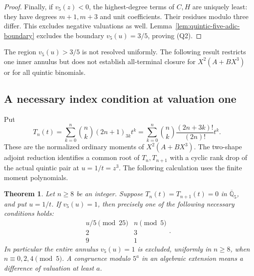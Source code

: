 \documentclass[11pt]{article}
\newtheorem{theorem}{Theorem}
\begin{document}
\begin{proof}
Finally, if $v_5(z)<0$, the highest-degree terms of $C,H$
are uniquely least: they have degrees $m+1,m+3$ and unit
coefficients. Their residues modulo three differ.
This excludes negative valuations as well.
Lemma~\ref{lem:quintic-five-adic-boundary} excludes the boundary
$v_5(u)=3/5$, proving (Q2).
\end{proof}
The region $v_5(u)>3/5$ is not resolved uniformly. The following result
restricts one inner annulus but does not establish all-terminal closure
for $X^2(A+BX^3)$ or for all quintic binomials.

\subsection{A necessary index condition at valuation one}
Put
\[
 T_n(t)=\sum_{k=0}^n\binom nk(2n+1)_{3k}t^k
       =\sum_{k=0}^n\binom nk\frac{(2n+3k)!}{(2n)!}t^k .
\]
These are the normalized ordinary moments of $X^2(A+BX^3)$.
The two-shape adjoint reduction identifies
a common root of $T_n,T_{n+1}$ with a cyclic rank drop of the actual
quintic pair at $u=1/t=z^3$. The following calculation uses the finite moment polynomials.

\begin{theorem}\label{thm:quintic-five-adic-inner-endpoint}
Let $n\ge8$ be an integer. Suppose $T_n(t)=T_{n+1}(t)=0$ in
$\overline{\mathbb Q}_5$, and put $u=1/t$. If $v_5(u)=1$, then
precisely one of the following necessary conditions holds:
\[
 \begin{array}{c|c}
 u/5\pmod{25}&n\pmod5\\ \hline
 2&3\\
 9&1
 \end{array}.
\]
In particular the entire annulus $v_5(u)=1$ is excluded, uniformly
in $n\ge8$, when $n\equiv0,2,4\pmod5$.
A congruence modulo $5^a$ in an algebraic extension means a difference
of valuation at least $a$.
\end{theorem}
\end{document}
